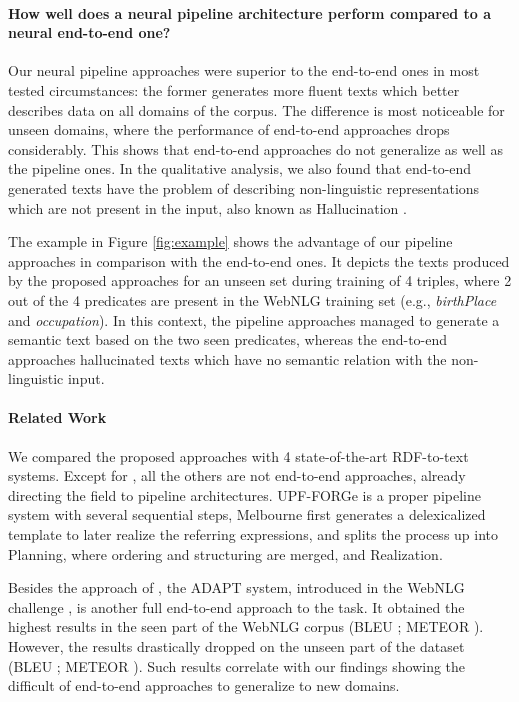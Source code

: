 \documentclass[11pt,a4paper]{article}
\begin{document}
\paragraph{How well does a neural pipeline architecture perform compared to a neural end-to-end one?} Our neural pipeline approaches were superior to the end-to-end ones in most tested circumstances: the former generates more fluent texts which better describes data on all domains of the corpus. The difference is most noticeable for unseen domains, where the performance of end-to-end approaches drops considerably. This shows that end-to-end approaches do not generalize as well as the pipeline ones. In the qualitative analysis, we also found that end-to-end generated texts have the problem of describing non-linguistic representations which are not present in the input, also known as Hallucination \cite{rohrbach2018}. 

The example in Figure \ref{fig:example} shows the advantage of our pipeline approaches in comparison with the end-to-end ones. It depicts the texts produced by the proposed approaches for an unseen set during training of 4 triples, where 2 out of the 4 predicates are present in the WebNLG training set (e.g., \textit{birthPlace} and \textit{occupation}). In this context, the pipeline approaches managed to generate a semantic text based on the two seen predicates, whereas the end-to-end approaches hallucinated texts which have no semantic relation with the non-linguistic input.

\paragraph{Related Work} We compared the proposed approaches with 4 state-of-the-art RDF-to-text systems. Except for \citet{marcheggiani2018}, all the others are not end-to-end approaches, already directing the field to pipeline architectures. UPF-FORGe is a proper pipeline system with several sequential steps, Melbourne first generates a delexicalized template to later realize the referring expressions, and \citet{amit2019} splits the process up into Planning, where ordering and structuring are merged, and Realization.

Besides the approach of \citet{marcheggiani2018}, the ADAPT system, introduced in the WebNLG challenge \cite{claire2017b}, is another full end-to-end approach to the task. It obtained the highest results in the seen part of the WebNLG corpus (BLEU ; METEOR ). However, the results drastically dropped on the unseen part of the dataset (BLEU ; METEOR ). Such results correlate with our findings showing the difficult of end-to-end approaches to generalize to new domains.
\end{document}
